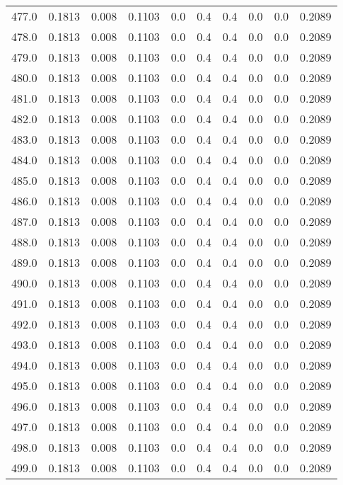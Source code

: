 \begin{longtable}{lrrrrrrrrr}
477.0 & 0.1813 & 0.008 & 0.1103 & 0.0 & 0.4 & 0.4 & 0.0 & 0.0 & 0.2089 \\
478.0 & 0.1813 & 0.008 & 0.1103 & 0.0 & 0.4 & 0.4 & 0.0 & 0.0 & 0.2089 \\
479.0 & 0.1813 & 0.008 & 0.1103 & 0.0 & 0.4 & 0.4 & 0.0 & 0.0 & 0.2089 \\
480.0 & 0.1813 & 0.008 & 0.1103 & 0.0 & 0.4 & 0.4 & 0.0 & 0.0 & 0.2089 \\
481.0 & 0.1813 & 0.008 & 0.1103 & 0.0 & 0.4 & 0.4 & 0.0 & 0.0 & 0.2089 \\
482.0 & 0.1813 & 0.008 & 0.1103 & 0.0 & 0.4 & 0.4 & 0.0 & 0.0 & 0.2089 \\
483.0 & 0.1813 & 0.008 & 0.1103 & 0.0 & 0.4 & 0.4 & 0.0 & 0.0 & 0.2089 \\
484.0 & 0.1813 & 0.008 & 0.1103 & 0.0 & 0.4 & 0.4 & 0.0 & 0.0 & 0.2089 \\
485.0 & 0.1813 & 0.008 & 0.1103 & 0.0 & 0.4 & 0.4 & 0.0 & 0.0 & 0.2089 \\
486.0 & 0.1813 & 0.008 & 0.1103 & 0.0 & 0.4 & 0.4 & 0.0 & 0.0 & 0.2089 \\
487.0 & 0.1813 & 0.008 & 0.1103 & 0.0 & 0.4 & 0.4 & 0.0 & 0.0 & 0.2089 \\
488.0 & 0.1813 & 0.008 & 0.1103 & 0.0 & 0.4 & 0.4 & 0.0 & 0.0 & 0.2089 \\
489.0 & 0.1813 & 0.008 & 0.1103 & 0.0 & 0.4 & 0.4 & 0.0 & 0.0 & 0.2089 \\
490.0 & 0.1813 & 0.008 & 0.1103 & 0.0 & 0.4 & 0.4 & 0.0 & 0.0 & 0.2089 \\
491.0 & 0.1813 & 0.008 & 0.1103 & 0.0 & 0.4 & 0.4 & 0.0 & 0.0 & 0.2089 \\
492.0 & 0.1813 & 0.008 & 0.1103 & 0.0 & 0.4 & 0.4 & 0.0 & 0.0 & 0.2089 \\
493.0 & 0.1813 & 0.008 & 0.1103 & 0.0 & 0.4 & 0.4 & 0.0 & 0.0 & 0.2089 \\
494.0 & 0.1813 & 0.008 & 0.1103 & 0.0 & 0.4 & 0.4 & 0.0 & 0.0 & 0.2089 \\
495.0 & 0.1813 & 0.008 & 0.1103 & 0.0 & 0.4 & 0.4 & 0.0 & 0.0 & 0.2089 \\
496.0 & 0.1813 & 0.008 & 0.1103 & 0.0 & 0.4 & 0.4 & 0.0 & 0.0 & 0.2089 \\
497.0 & 0.1813 & 0.008 & 0.1103 & 0.0 & 0.4 & 0.4 & 0.0 & 0.0 & 0.2089 \\
498.0 & 0.1813 & 0.008 & 0.1103 & 0.0 & 0.4 & 0.4 & 0.0 & 0.0 & 0.2089 \\
499.0 & 0.1813 & 0.008 & 0.1103 & 0.0 & 0.4 & 0.4 & 0.0 & 0.0 & 0.2089 \\

\end{longtable}
